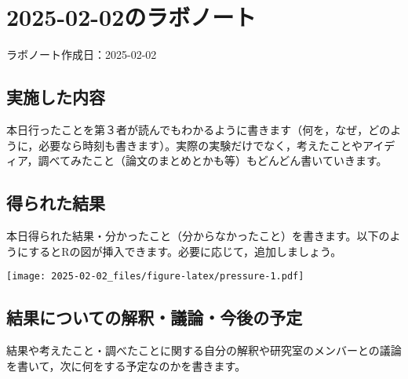 \documentclass[11pt,a4paper,xelatex,ja=standard]{bxjsarticle}
\author{}
\date{}
\begin{document}
\pagestyle{empty}
\pagestyle{plain}
\setcounter{page}{1}

\section{2025-02-02のラボノート}\label{ux306eux30e9ux30dcux30ceux30fcux30c8}

ラボノート作成日：2025-02-02

\subsection{実施した内容}\label{ux5b9fux65bdux3057ux305fux5185ux5bb9}

本日行ったことを第３者が読んでもわかるように書きます（何を，なぜ，どのように，必要なら時刻も書きます）。実際の実験だけでなく，考えたことやアイディア，調べてみたこと（論文のまとめとかも等）もどんどん書いていきます。

\subsection{得られた結果}\label{ux5f97ux3089ux308cux305fux7d50ux679c}

本日得られた結果・分かったこと（分からなかったこと）を書きます。以下のようにするとRの図が挿入できます。必要に応じて，追加しましょう。

\texttt{[image: 2025-02-02\_files/figure-latex/pressure-1.pdf]}

\subsection{結果についての解釈・議論・今後の予定}\label{ux7d50ux679cux306bux3064ux3044ux3066ux306eux89e3ux91c8ux8b70ux8ad6ux4ecaux5f8cux306eux4e88ux5b9a}

結果や考えたこと・調べたことに関する自分の解釈や研究室のメンバーとの議論を書いて，次に何をする予定なのかを書きます。
\end{document}
